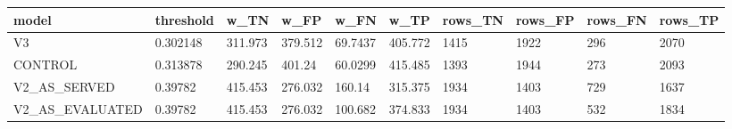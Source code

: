 \begin{tabular}{llllllllll}
\hline
model & threshold & w\_TN & w\_FP & w\_FN & w\_TP & rows\_TN & rows\_FP & rows\_FN & rows\_TP \\
\hline
V3 & 0.302148 & 311.973 & 379.512 & 69.7437 & 405.772 & 1415 & 1922 & 296 & 2070 \\
CONTROL & 0.313878 & 290.245 & 401.24 & 60.0299 & 415.485 & 1393 & 1944 & 273 & 2093 \\
V2\_AS\_SERVED & 0.39782 & 415.453 & 276.032 & 160.14 & 315.375 & 1934 & 1403 & 729 & 1637 \\
V2\_AS\_EVALUATED & 0.39782 & 415.453 & 276.032 & 100.682 & 374.833 & 1934 & 1403 & 532 & 1834 \\
\hline
\end{tabular}
